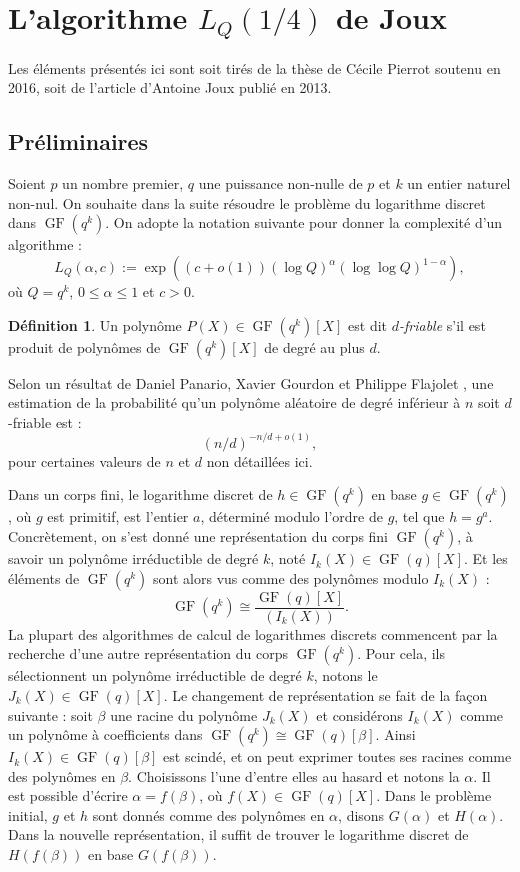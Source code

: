 \documentclass[a4paper, titlepage]{article}
\theoremstyle{definition}
\newtheorem{defi}[theo]{Définition}
\theoremstyle{remark}
\def\o{o}
\def\gf{\operatorname{GF}}
\begin{document}
\section{L'algorithme $L_Q(1/4)$ de Joux}

Les éléments présentés ici sont soit tirés de la thèse de Cécile Pierrot \cite{pierrot2016} soutenu en 2016, soit de l'article d'Antoine Joux \cite{joux2013} publié en 2013.

\subsection{Préliminaires}

Soient $p$ un nombre premier, $q$ une puissance non-nulle de $p$ et $k$ un entier naturel non-nul. On souhaite dans la suite résoudre le problème du logarithme discret dans $\gf(q^k)$. On adopte la notation suivante pour donner la complexité d'un algorithme :
$$L_Q(\alpha, c) := \exp\left({(c+\o(1))(\log Q)^\alpha(\log\log Q)^{1 - \alpha}}\right),$$
où $Q = q^k$, $0 \leqslant \alpha\leqslant 1$ et $c > 0$.

\begin{defi}
Un polynôme $P(X) \in \gf(q^k)[X]$ est dit \textit{$d$-friable} s'il est produit de polynômes de $\gf(q^k)[X]$ de degré au plus $d$.
\end{defi}

Selon un résultat de Daniel Panario, Xavier Gourdon et Philippe Flajolet \cite{PGF98}, une estimation de la probabilité qu'un polynôme aléatoire de degré inférieur à $n$ soit $d$-friable est :
$${(n/d)}^{-n/d + \o(1)},$$
pour certaines valeurs de $n$ et $d$ non détaillées ici.

Dans un corps fini, le logarithme discret de $h \in \gf(q^k)$ en base $g \in \gf(q^k)$, où $g$ est primitif, est l'entier $a$, déterminé modulo l'ordre de $g$, tel que $h = g^a$. Concrètement, on s'est donné une représentation du corps fini $\gf(q^k)$, à savoir un polynôme irréductible de degré $k$, noté $I_k(X) \in \gf(q)[X]$. Et les éléments de $\gf(q^k)$ sont alors vus comme des polynômes modulo $I_k(X)$ : $$\gf(q^k) \cong \frac{\gf(q)[X]}{(I_k(X))}.$$
La plupart des algorithmes de calcul de logarithmes discrets commencent par la recherche d'une autre représentation du corps $\gf(q^k)$. Pour cela, ils sélectionnent un polynôme irréductible de degré $k$, notons le $J_k(X) \in \gf(q)[X]$. Le changement de représentation se fait de la façon suivante : soit $\beta$ une racine du polynôme $J_k(X)$ et considérons $I_k(X)$ comme un polynôme à coefficients dans $\gf(q^k) \cong \gf(q)[\beta]$. Ainsi $I_k(X) \in \gf(q)[\beta]$ est scindé, et on peut exprimer toutes ses racines comme des polynômes en $\beta$. Choisissons l'une d'entre elles au hasard et notons la $\alpha$. Il est possible d'écrire $\alpha = f(\beta)$, où $f(X) \in \gf(q)[X]$. Dans le problème initial, $g$ et $h$ sont donnés comme des polynômes en $\alpha$, disons $G(\alpha)$ et $H(\alpha)$. Dans la nouvelle représentation, il suffit de trouver le logarithme discret de $H(f(\beta))$ en base $G(f(\beta))$.
\end{document}
